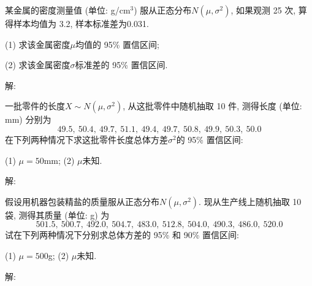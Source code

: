 \documentclass[standard]{ExBook}
\begin{document}
\begin{qitems}
    \begin{bbox}
    \begin{shaded}
        \qitem
某金属的密度测量值 (单位: g/cm$^3$) 服从正态分布$N(\mu,\sigma^2)$, 如果观测 25 次, 算得样本均值为 3.2, 样本标准差为0.031.

(1) 求该金属密度$\mu$均值的 95\% 置信区间;

(2) 求该金属密度$\sigma$标准差的 95\% 置信区间.
    \end{shaded}
    \end{bbox}

\vspace{-5em}

    \begin{bbox}
解: 
    \end{bbox}

\vspace{-5em}

    \begin{bbox}
    \begin{shaded}
        \qitem
一批零件的长度$X \sim N(\mu,\sigma^2)$, 从这批零件中随机抽取 10 件, 测得长度 (单位: mm) 分别为
$$49.5,\ 50.4,\ 49.7,\ 51.1,\ 49.4,\ 49.7,\ 50.8,\ 49.9,\ 50.3,\ 50.0$$
在下列两种情况下求这批零件长度总体方差$\sigma^2$的 95\% 置信区间:

(1) $\mu = 50$mm; \qquad (2) $\mu$未知.
    \end{shaded}
    \end{bbox}

\vspace{-5em}

    \begin{bbox}
解: 
    \end{bbox}

\vspace{-5em}

    \begin{bbox}
    \begin{shaded}
        \qitem
假设用机器包装精盐的质量服从正态分布$N(\mu,\sigma^2)$. 现从生产线上随机抽取 10 袋, 测得其质量 (单位: g) 为
$$501.5,\ 500.7,\ 492.0,\ 504.7,\ 483.0,\ 512.8,\ 504.0,\ 490.3,\ 486.0,\ 520.0$$
试在下列两种情况下分别求总体方差的 95\% 和 90\% 置信区间:

(1) $\mu=500$g; \qquad (2) $\mu$未知.
    \end{shaded}
    \end{bbox}

\vspace{-5em}

    \begin{bbox}
解: 
    \end{bbox}


\end{qitems}
\end{document}
